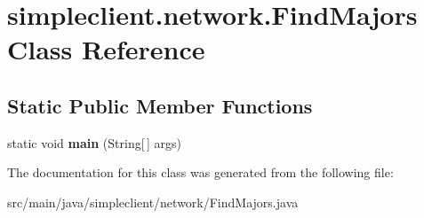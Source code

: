 \hypertarget{classsimpleclient_1_1network_1_1FindMajors}{}\section{simpleclient.\+network.\+Find\+Majors Class Reference}
\label{classsimpleclient_1_1network_1_1FindMajors}
\subsection*{Static Public Member Functions}
\begin{DoxyCompactItemize}
\item 
\mbox{\label{classsimpleclient_1_1network_1_1FindMajors_ac35460adb6da634cb7f5af78048504ec}} 
static void {\bfseries main} (String\mbox{[}$\,$\mbox{]} args)
\end{DoxyCompactItemize}


The documentation for this class was generated from the following file\+:\begin{DoxyCompactItemize}
\item 
src/main/java/simpleclient/network/Find\+Majors.\+java\end{DoxyCompactItemize}
